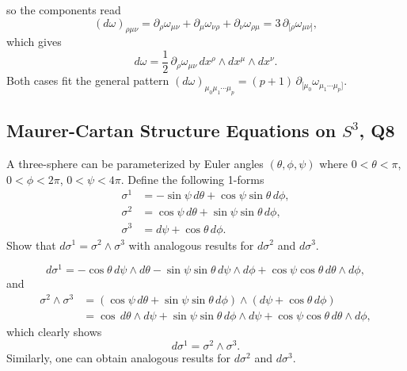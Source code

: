 \begin{solution}
\begin{equation}
    \end{equation}
    so the components read
    \begin{equation}
        (d\omega)_{\rho\mu\nu} = \partial_\rho\omega_{\mu\nu} + \partial_\mu\omega_{\nu\rho} + \partial_\nu\omega_{\rho\mu} = 3\,\partial_{[\rho}\omega_{\mu\nu]},
    \end{equation}
    which gives
    \begin{equation}
        d\omega = \frac{1}{2}\,\partial_\rho\omega_{\mu\nu}\,dx^\rho\wedge dx^\mu\wedge dx^\nu.
    \end{equation}
    Both cases fit the general pattern $(d\omega)_{\mu_0\mu_1\cdots\mu_p} = (p+1)\,\partial_{[\mu_0}\omega_{\mu_1\cdots\mu_p]}$.
\end{solution}

\subsection{Maurer-Cartan Structure Equations on $S^3$, Q8}

A three-sphere can be parameterized by Euler angles $(\theta,\phi,\psi)$ where $0<\theta<\pi$, $0<\phi<2\pi$, $0<\psi<4\pi$. Define the following 1-forms
\begin{align*}
    \sigma^1 &= -\sin\psi\,d\theta + \cos\psi\sin\theta\,d\phi,\\
    \sigma^2 &= \cos\psi\,d\theta + \sin\psi\sin\theta\,d\phi,\\
    \sigma^3 &= d\psi + \cos\theta\,d\phi.
\end{align*}
Show that $d\sigma^1 = \sigma^2\wedge\sigma^3$ with analogous results for $d\sigma^2$ and $d\sigma^3$.
\begin{solution}
    \begin{equation}
        d\sigma^1 = -\cos\theta \,d\psi\wedge d\theta - \sin\psi\sin\theta\,d\psi\wedge d\phi + \cos\psi\cos\theta \, d\theta\wedge d\phi,
    \end{equation}
    and
    \begin{equation}
    \begin{aligned}
        \sigma^2 \wedge \sigma^3 &= (\cos\psi\,d\theta + \sin\psi\sin\theta\,d\phi) \wedge (d\psi + \cos\theta\,d\phi)\\ 
        &= \cos\, d\theta \wedge d\psi + \sin\psi\sin\theta \, d\phi \wedge d\psi +\cos\psi\cos\theta\,d\theta \wedge d\phi,
    \end{aligned}
    \end{equation} 
    which clearly shows
    \begin{equation}
        d\sigma^1 = \sigma^2\wedge\sigma^3.
    \end{equation}
    Similarly, one can obtain analogous results for $d\sigma^2$ and $d\sigma^3$.
    
\end{solution}

